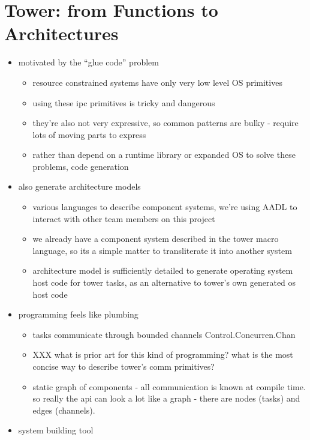 \section{Tower: from Functions to Architectures}

\begin{itemize}
\item motivated by the ``glue code'' problem
	\begin{itemize}
		\item resource constrained systems have only very low level OS
			primitives
		\item using these ipc primitives is tricky and dangerous
		\item they're also not very expressive, so common patterns are
			bulky - require lots of moving parts to express
		\item rather than depend on a runtime library or expanded OS to
			solve these problems, code generation
	\end{itemize}
\item also generate architecture models
	\begin{itemize}
		\item various languages to describe component systems, we're
			using AADL to interact with other team members on this
			project
		\item we already have a component system described in the tower
			macro language, so its a simple matter to transliterate
			it into another system
		\item architecture model is sufficiently detailed to generate
			operating system host code for tower tasks, as an
			alternative to tower's own generated os host code
	\end{itemize}
\item programming feels like plumbing
	\begin{itemize}
		\item tasks communicate through bounded channels
			Control.Concurren.Chan
		\item XXX what is prior art for this kind of programming?
			what is the most concise way to describe tower's comm
			primitives?
		\item static graph of components - all communication is known at
			compile time. so really the api can look a lot like a
			graph - there are nodes (tasks) and edges (channels).
	\end{itemize}
\item system building tool
	\begin{itemize}

\end{itemize}
\end{itemize}
